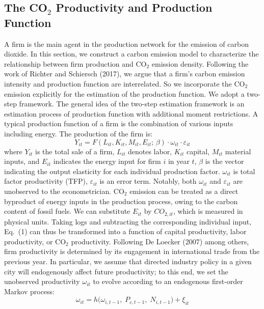 \documentclass[11pt,a4paper]{article}
\begin{document}
\subsection{The CO$_2$ Productivity and Production Function}

A firm is the main agent in the production network for the emission of carbon dioxide. In this section, we construct a carbon emission model to characterize the relationship between firm production and CO$_2$ emission density. Following the work of Richter and Schiersch (2017), we argue that a firm's carbon emission intensity and production function are interrelated. So we incorporate the CO$_2$ emission explicitly for the estimation of the production function. We adopt a two-step framework. The general idea of the two-step estimation framework is an estimation process of production function with additional moment restrictions. A typical production function of a firm is the combination of various inputs including energy. The production of the firm is:
\begin{equation}
Y_{it} = F(L_{it}, K_{it}, M_{it}, E_{it};\,\beta)\cdot\omega_{it}\cdot\varepsilon_{it}
\end{equation}
where $Y_{it}$ is the total sale of a firm, $L_{it}$ denotes labor, $K_{it}$ capital, $M_{it}$ material inputs, and $E_{it}$ indicates the energy input for firm $i$ in year $t$, $\beta$ is the vector indicating the output elasticity for each individual production factor. $\omega_{it}$ is total factor productivity (TFP), $\varepsilon_{it}$ is an error term. Notably, both $\omega_{it}$ and $\varepsilon_{it}$ are unobserved to the econometrician. CO$_2$ emission can be treated as a direct byproduct of energy inputs in the production process, owing to the carbon content of fossil fuels. We can substitute $E_{it}$ by $CO_{2,it}$, which is measured in physical units. Taking logs and subtracting the corresponding individual input, Eq.~(1) can thus be transformed into a function of capital productivity, labor productivity, or CO$_2$ productivity. Following De Loecker (2007) among others, firm productivity is determined by its engagement in international trade from the previous year. In particular, we assume that directed industry policy in a given city will endogenously affect future productivity; to this end, we set the unobserved productivity $\omega_{it}$ to evolve according to an endogenous first-order Markov process:
\begin{equation}
\omega_{it} = h\bigl(\omega_{i,t-1},\; P_{c,t-1},\; N_{i,t-1}\bigr) + \xi_{it}
\end{equation}
\end{document}
